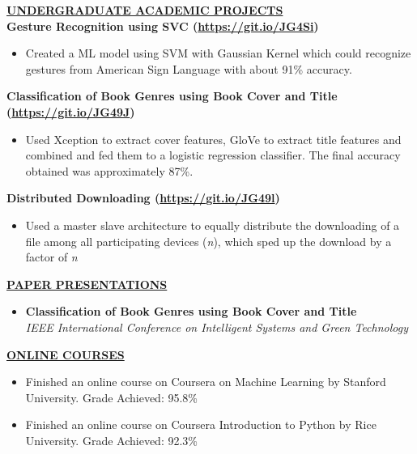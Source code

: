 \documentclass{article}
\begin{document}
\noindent \textbf{\underline{UNDERGRADUATE ACADEMIC PROJECTS}} \\
\noindent \textbf{Gesture Recognition using SVC (\url{https://git.io/JG4Si})} 
\begin{itemize}[noitemsep,nolistsep,leftmargin=*]
\item {Created a ML model using SVM with Gaussian Kernel which could recognize gestures from American Sign Language with about 91\% accuracy. \\}
\end{itemize}

\noindent \textbf{Classification of Book Genres using Book Cover and Title (\url{https://git.io/JG49J})} 
\begin{itemize}[noitemsep,nolistsep,leftmargin=*]
\item {Used Xception to extract cover features, GloVe to extract title features and combined and fed them to a logistic regression classifier. The final accuracy obtained was approximately 87\%. \\}
\end{itemize}

\noindent \textbf{Distributed Downloading (\url{https://git.io/JG49l})} 
\begin{itemize}[noitemsep,nolistsep,leftmargin=*]
\item {Used a master slave architecture to equally distribute the downloading of a file among all participating devices (\textit{n}), which sped up the download by a factor of \textit{n} \\}
\end{itemize}
\pagebreak
\noindent \textbf{\underline{PAPER PRESENTATIONS}}
\begin{itemize}[noitemsep,nolistsep,leftmargin=*]
\item {\textbf{Classification of Book Genres using Book Cover and Title} \\} 
\textit{IEEE International Conference on Intelligent Systems and Green Technology \\}
\end{itemize}


\noindent \textbf{\underline{ONLINE COURSES}}
\begin{itemize}[noitemsep,nolistsep,leftmargin=*]
\item {Finished an online course on Coursera on Machine Learning by Stanford University. Grade Achieved: 95.8\%} 
\item {Finished an online course on Coursera Introduction to Python by Rice University. Grade Achieved: 92.3\%}
\end{itemize}
\end{document}
